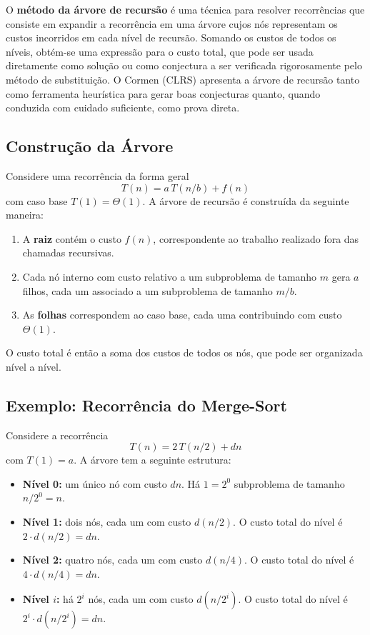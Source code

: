 \documentclass[9pt,a4paper]{extarticle}
\begin{document}
O \textbf{método da árvore de recursão} é uma técnica para resolver recorrências que consiste em expandir a recorrência em uma árvore cujos nós representam os custos incorridos em cada nível de recursão. Somando os custos de todos os níveis, obtém-se uma expressão para o custo total, que pode ser usada diretamente como solução ou como conjectura a ser verificada rigorosamente pelo método de substituição. O Cormen (CLRS) apresenta a árvore de recursão tanto como ferramenta heurística para gerar boas conjecturas quanto, quando conduzida com cuidado suficiente, como prova direta.

\subsection{Construção da Árvore}

Considere uma recorrência da forma geral
%
\[
T(n) = a\,T(n/b) + f(n)
\]
%
\noindent com caso base $T(1) = \Theta(1)$. A árvore de recursão é construída da seguinte maneira:

\begin{enumerate}
    \item A \textbf{raiz} contém o custo $f(n)$, correspondente ao trabalho realizado fora das chamadas recursivas.
    \item Cada nó interno com custo relativo a um subproblema de tamanho $m$ gera $a$ filhos, cada um associado a um subproblema de tamanho $m/b$.
    \item As \textbf{folhas} correspondem ao caso base, cada uma contribuindo com custo $\Theta(1)$.
\end{enumerate}

\noindent O custo total é então a soma dos custos de todos os nós, que pode ser organizada nível a nível.

\subsection{Exemplo: Recorrência do Merge-Sort}

Considere a recorrência
%
\[
T(n) = 2\,T(n/2) + dn
\]
%
\noindent com $T(1) = a$. A árvore tem a seguinte estrutura:

\begin{itemize}
    \item \textbf{Nível 0:} um único nó com custo $dn$. Há $1 = 2^0$ subproblema de tamanho $n/2^0 = n$.
    \item \textbf{Nível 1:} dois nós, cada um com custo $d(n/2)$. O custo total do nível é $2 \cdot d(n/2) = dn$.
    \item \textbf{Nível 2:} quatro nós, cada um com custo $d(n/4)$. O custo total do nível é $4 \cdot d(n/4) = dn$.
    \item \textbf{Nível $i$:} há $2^i$ nós, cada um com custo $d(n/2^i)$. O custo total do nível é $2^i \cdot d(n/2^i) = dn$.
\end{itemize}
\end{document}
